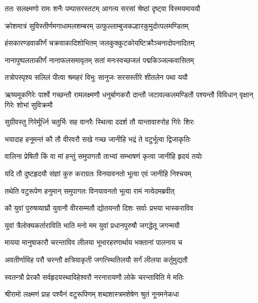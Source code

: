 





\twolineshloka
{ततः सलक्ष्मणो रामः शनैः पम्पासरस्तटम्}
{आगत्य सरसां श्रेष्ठां दृष्ट्वा विस्मयमाययौ} %

\twolineshloka
{क्रोशमात्रं सुविस्तीर्णमगाधामलशम्बरम्}
{उत्फुल्लाम्बुजकल्हारकुमुदोत्पलमण्डितम्} %

\twolineshloka
{हंसकारण्डवाकीर्णं चक्रवाकादिशोभितम्}
{जलकुक्कुटकोयष्टिक्रौञ्चनादोपनादितम्} %

\twolineshloka
{नानापुष्पलताकीर्णं नानाफलसमावृतम्}
{सतां मनःस्वच्छजलं पद्मकिञ्जल्कवासितम्} %

\twolineshloka
{तत्रोपस्पृश्य सलिलं पीत्वा श्रमहरं विभुः}
{सानुजः सरसस्तीरे शीतलेन पथा ययौ} %

\threelineshloka
{ऋष्यमूकगिरेः पार्श्वे गच्छन्तौ रामलक्ष्मणौ}
{धनुर्बाणकरौ दान्तौ जटावल्कलमण्डितौ}
{पश्यन्तौ विविधान् वृक्षान् गिरेः शोभां सुविक्रमौ} %

\twolineshloka
{सुग्रीवस्तु गिरेर्मूर्ध्नि चतुर्भिः सह वानरैः}
{स्थित्वा ददर्श तौ यान्तावारुरोह गिरेः शिरः} %

\twolineshloka
{भयादाह हनूमन्तं कौ तौ वीरवरौ सखे}
{गच्छ जानीहि भद्रं ते वटुर्भूत्वा द्विजाकृतिः} %

\twolineshloka
{वालिना प्रेषितौ किं वा मां हन्तुं समुपागतौ}
{ताभ्यां सम्भाषणं कृत्वा जानीहि हृदयं तयोः} %

\twolineshloka
{यदि तौ दुष्टहृदयौ संज्ञां कुरु कराग्रतः}
{विनयावनतो भूत्वा एवं जानीहि निश्चयम्} %

\twolineshloka
{तथेति वटुरूपेण हनुमान् समुपागतः}
{विनयावनतो भूत्वा रामं नत्वेदमब्रवीत्} %

\twolineshloka
{कौ युवां पुरुषव्याघ्रौ युवानौ वीरसम्मतौ}
{द्योतयन्तौ दिशः सर्वाः प्रभया भास्कराविव} %

\twolineshloka
{युवां त्रैलोक्यकर्ताराविति भाति मनो मम}
{युवां प्रधानपुरुषौ जगद्धेतू जगन्मयौ} %

\twolineshloka
{मायया मानुषाकारौ चरन्ताविव लीलया}
{भूभारहरणार्थाय भक्तानां पालनाय च} %

\twolineshloka
{अवतीर्णाविह परौ चरन्तौ क्षत्रियाकृती}
{जगत्स्थितिलयौ सर्गं लीलया कर्तुमुद्यतौ} %

\twolineshloka
{स्वतन्त्रौ प्रेरकौ सर्वहृदयस्थाविहेश्वरौ}
{नरनारायणौ लोके चरन्ताविति मे मतिः} %

\twolineshloka
{श्रीरामो लक्ष्मणं प्राह पश्यैनं वटुरूपिणम्}
{शब्दशास्त्रमशेषेण श्रुतं नूनमनेकधा} %


